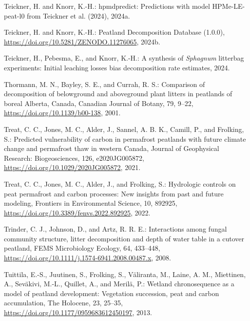 \documentclass[
  12pt,
]{article}
\newlength{\cslhangindent}
\newlength{\cslentryspacingunit} %
\newenvironment{CSLReferences}[2] %
 {%
  \setlength{\parindent}{0pt}
  \ifodd #1
  \let\oldpar\par
  \def\par{\hangindent=\cslhangindent\oldpar}
  \fi
  \setlength{\parskip}{#2\cslentryspacingunit}
 }%
 {}
\begin{document}
\begin{CSLReferences}{0}{0}
\leavevmode{}%
Teickner, H. and Knorr, K.-H.: {hpmdpredict}: {Predictions} with model {HPMe-LE-peat-l0} from {Teickner} et al. (2024), 2024a.

\leavevmode{}%
Teickner, H. and Knorr, K.-H.: Peatland {Decomposition Database} (1.0.0), \url{https://doi.org/10.5281/ZENODO.11276065}, 2024b.

\leavevmode{}%
Teickner, H., Pebesma, E., and Knorr, K.-H.: A synthesis of {\emph{Sphagnum}} litterbag experiments: {Initial} leaching losses bias decomposition rate estimates, 2024.

\leavevmode{}%
Thormann, M. N., Bayley, S. E., and Currah, R. S.: Comparison of decomposition of belowground and aboveground plant litters in peatlands of boreal {Alberta}, {Canada}, Canadian Journal of Botany, 79, 9--22, \url{https://doi.org/10.1139/b00-138}, 2001.

\leavevmode{}%
Treat, C. C., Jones, M. C., Alder, J., Sannel, A. B. K., Camill, P., and Frolking, S.: Predicted vulnerability of carbon in permafrost peatlands with future climate change and permafrost thaw in western {Canada}, Journal of Geophysical Research: Biogeosciences, 126, e2020JG005872, \url{https://doi.org/10.1029/2020JG005872}, 2021.

\leavevmode{}%
Treat, C. C., Jones, M. C., Alder, J., and Frolking, S.: Hydrologic controls on peat permafrost and carbon processes: {New} insights from past and future modeling, Frontiers in Environmental Science, 10, 892925, \url{https://doi.org/10.3389/fenvs.2022.892925}, 2022.

\leavevmode{}%
Trinder, C. J., Johnson, D., and Artz, R. R. E.: Interactions among fungal community structure, litter decomposition and depth of water table in a cutover peatland, FEMS Microbiology Ecology, 64, 433--448, \url{https://doi.org/10.1111/j.1574-6941.2008.00487.x}, 2008.

\leavevmode{}%
Tuittila, E.-S., Juutinen, S., Frolking, S., Väliranta, M., Laine, A. M., Miettinen, A., Seväkivi, M.-L., Quillet, A., and Merilä, P.: Wetland chronosequence as a model of peatland development: {Vegetation} succession, peat and carbon accumulation, The Holocene, 23, 25--35, \url{https://doi.org/10.1177/0959683612450197}, 2013.


\end{CSLReferences}
\end{document}
